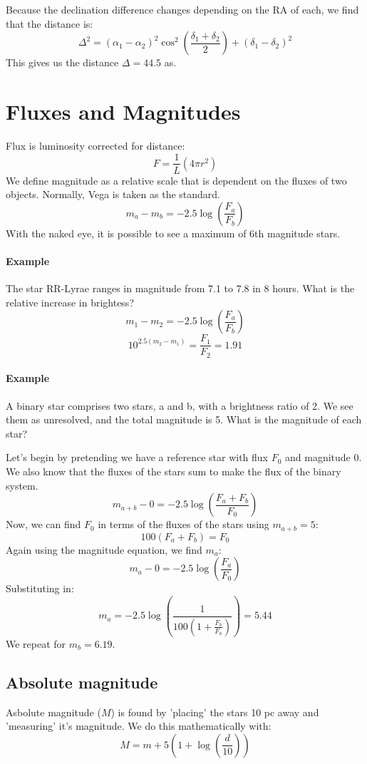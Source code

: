 Because the declination difference changes depending on the RA of each, we find
that the distance is:
$$
	\Delta^2 = (\alpha_1 - \alpha_2)^2
	\cos^2\left(\frac{\delta_1 + \delta_2}{2}\right) + 
	(\delta_1 - \delta_2)^2
$$
This gives us the distance $\Delta = 44.5$ as.

\section{Fluxes and Magnitudes}

Flux is luminosity corrected for distance:
$$
	F = \frac{1}{L}(4\pi r^2)
$$
We define magnitude as a relative scale that is dependent on the fluxes of two
objects. Normally, Vega is taken as the standard.
$$
	m_a - m_b = -2.5\log\left(\frac{F_a}{F_b}\right)
$$
With the naked eye, it is possible to see a maximum of 6th magnitude stars.

\paragraph{Example}
The star RR-Lyrae ranges in magnitude from 7.1 to 7.8 in 8 hours. What is the
relative increase in brightess?
$$
	m_1 - m_2 = -2.5\log\left(\frac{F_a}{F_b}\right)
$$
$$
	10^{2.5(m_2 - m_1)} = \frac{F_1}{F_2} = 1.91
$$

\paragraph{Example}
A binary star comprises two stars, a and b, with a brightness ratio of 2. We see
them as unresolved, and the total magnitude is 5. What is the magnitude of each
star?

Let's begin by pretending we have a reference star with flux $F_0$ and magnitude
0. We also know that the fluxes of the stars sum to make the flux of the binary
system.
$$
	m_{a+b} - 0 = -2.5\log\left(\frac{F_a + F_b}{F_0}\right)
$$
Now, we can find $F_0$ in terms of the fluxes of the stars using $m_{a+b} = 5$:
$$
	100(F_a + F_b) = F_0
$$
Again using the magnitude equation, we find $m_a$:
$$
	m_a - 0 = -2.5\log\left(\frac{F_a}{F_0}\right)
$$
Substituting in:
$$
	m_a = -2.5\log\left(\frac{1}{100(1+\frac{F_b}{F_a})}\right) = 5.44
$$
We repeat for $m_b = 6.19$.

\subsection{Absolute magnitude}
Asbolute magnitude ($M$) is found by 'placing' the stars 10 pc away and
'measuring' it's magnitude. We do this mathematically with:
$$
	M = m + 5\left(1 + \log\left(\frac{d}{10}\right)\right)
$$
